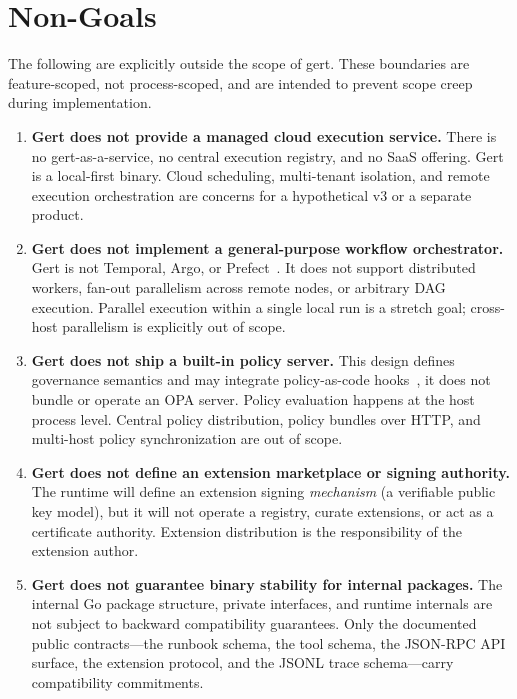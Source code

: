 \section{Non-Goals}

The following are explicitly outside the scope of gert. These boundaries are feature-scoped, not
process-scoped, and are intended to prevent scope creep during implementation.

\begin{enumerate}[label=\textbf{NG\arabic*.}]

  \item \textbf{Gert does not provide a managed cloud execution service.}
    There is no gert-as-a-service, no central execution registry, and no SaaS offering. Gert is a
    local-first binary. Cloud scheduling, multi-tenant isolation, and remote execution orchestration
    are concerns for a hypothetical v3 or a separate product.

  \item \textbf{Gert does not implement a general-purpose workflow orchestrator.}
    Gert is not Temporal, Argo, or Prefect~\cite{temporal-docs,argo-workflows,prefect-docs}. It does not support distributed workers, fan-out
    parallelism across remote nodes, or arbitrary DAG execution. Parallel execution within a single
    local run is a stretch goal; cross-host parallelism is explicitly out of scope.

  \item \textbf{Gert does not ship a built-in policy server.}
    This design defines governance semantics and may integrate policy-as-code hooks~\cite{opa-docs}, it does not
    bundle or operate an OPA server. Policy evaluation happens at the host process level. Central
    policy distribution, policy bundles over HTTP, and multi-host policy synchronization are out of
    scope.

  \item \textbf{Gert does not define an extension marketplace or signing authority.}
    The runtime will define an extension signing \textit{mechanism} (a verifiable public key model), but it
    will not operate a registry, curate extensions, or act as a certificate authority. Extension
    distribution is the responsibility of the extension author.

  \item \textbf{Gert does not guarantee binary stability for internal packages.}
    The internal Go package structure, private interfaces, and runtime internals are not subject to
    backward compatibility guarantees. Only the documented public contracts---the runbook schema,
    the tool schema, the JSON-RPC API surface, the extension protocol, and the JSONL trace
    schema---carry compatibility commitments.

\end{enumerate}
